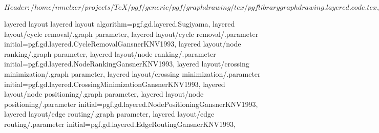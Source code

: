%
%
%

\ProvidesFileRCS[v\pgfversion] $Header: /home/nmelzer/projects/TeX/pgf/generic/pgf/graphdrawing/tex/pgflibrarygraphdrawing.layered.code.tex,v 1.2 2012/04/19 13:49:07 tantau Exp $






%
%




%
%
\pgfgddeclarealgorithmkey
  {layered layout}
  {layered layout}
  {
    algorithm=pgf.gd.layered.Sugiyama,
    layered layout/cycle removal/.graph parameter,
    layered layout/cycle removal/.parameter initial=pgf.gd.layered.CycleRemovalGansnerKNV1993,
    layered layout/node ranking/.graph parameter,
    layered layout/node ranking/.parameter initial=pgf.gd.layered.NodeRankingGansnerKNV1993,
    layered layout/crossing minimization/.graph parameter,
    layered layout/crossing minimization/.parameter initial=pgf.gd.layered.CrossingMinimizationGansnerKNV1993,
    layered layout/node positioning/.graph parameter,
    layered layout/node positioning/.parameter initial=pgf.gd.layered.NodePositioningGansnerKNV1993,
    layered layout/edge routing/.graph parameter,
    layered layout/edge routing/.parameter initial=pgf.gd.layered.EdgeRoutingGansnerKNV1993,
  }




\endinput
